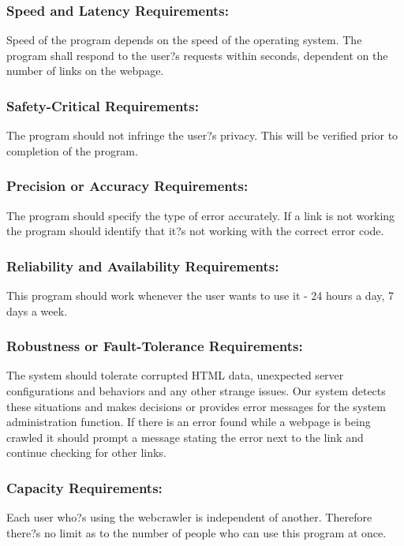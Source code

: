 \documentclass[titlepage]{article}
\begin{document}
\subsubsection*{Speed and Latency Requirements:}
Speed of the program depends on the speed of the operating system. The program shall respond to the user?s requests within seconds, dependent on the number of links on the webpage. 

\subsubsection*{Safety-Critical Requirements: }The program should not infringe the user?s privacy. 
This will be verified prior to completion of the program.

\subsubsection*{Precision or Accuracy Requirements:}
The program should specify the type of error accurately. If a link is not working the program should identify that it?s not working with the correct error code.

\subsubsection*{Reliability and Availability Requirements:}

This program should work whenever the user wants to use it - 24 hours a day, 7 days a week.

\subsubsection*{Robustness or Fault-Tolerance Requirements:}
The system should tolerate corrupted HTML data, unexpected server configurations and behaviors and any other strange issues. Our system detects these situations and makes decisions or provides error messages for the system administration function.
If there is an error found while a webpage is being crawled it should prompt a message stating the error next to the link and continue checking for other links.

\subsubsection*{Capacity Requirements:}
Each user who?s using the webcrawler is independent of another. Therefore there?s no limit as to the number of people who can use this program at once.
\end{document}
